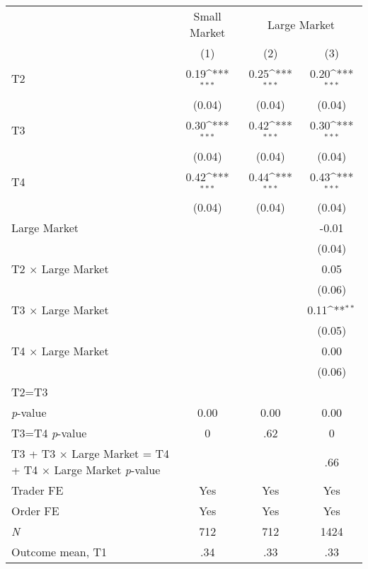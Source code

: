 {
\def\sym#1{\ifmmode^{#1}\else\(^{#1}\)\fi}
\begin{tabular}{l*{3}{c}}
\toprule
                &\multicolumn{1}{c}{Small Market}&\multicolumn{2}{c}{Large Market}     \\\cmidrule(lr){2-2}\cmidrule(lr){3-4}
                &\multicolumn{1}{c}{(1)}         &\multicolumn{1}{c}{(2)}         &\multicolumn{1}{c}{(3)}         \\
\midrule
T2              &     0.19\sym{***}&     0.25\sym{***}&     0.20\sym{***}\\
                &   (0.04)         &   (0.04)         &   (0.04)         \\
T3              &     0.30\sym{***}&     0.42\sym{***}&     0.30\sym{***}\\
                &   (0.04)         &   (0.04)         &   (0.04)         \\
T4              &     0.42\sym{***}&     0.44\sym{***}&     0.43\sym{***}\\
                &   (0.04)         &   (0.04)         &   (0.04)         \\
Large Market    &                  &                  &    -0.01         \\
                &                  &                  &   (0.04)         \\
T2 $\times$ Large Market&                  &                  &     0.05         \\
                &                  &                  &   (0.06)         \\
T3 $\times$ Large Market&                  &                  &     0.11\sym{**} \\
                &                  &                  &   (0.05)         \\
T4 $\times$ Large Market&                  &                  &     0.00         \\
                &                  &                  &   (0.06)         \\
\midrule
T2=T3           &                  &                  &                  \\
\textit{p}-value&     0.00         &     0.00         &     0.00         \\
 T3=T4 \textit{p}-value&        0         &      .62         &        0         \\
 T3 + T3 $\times$ Large Market = T4 + T4 $\times$ Large Market \textit{p}-value&                  &                  &      .66         \\
Trader FE       &      Yes         &      Yes         &      Yes         \\
Order FE        &      Yes         &      Yes         &      Yes         \\
 \textit{N}     &      712         &      712         &     1424         \\
 Outcome mean, T1&      .34         &      .33         &      .33         \\
\bottomrule
\end{tabular}
}
